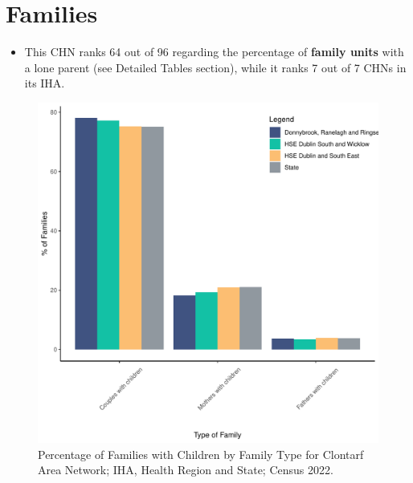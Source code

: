 \documentclass{article}
\begin{document}
\section{Families}\label{sect:Fam}
\begin{itemize}
\item This CHN ranks  64 out of 96 regarding the percentage of \textbf{family units} with a lone parent (see Detailed Tables section), while it ranks   7 out of 7 CHNs in its IHA.
\end{itemize}
\begin{figure}[H]
	\centering
	\includegraphics[width = 150mm]{../figures/FamED.pdf}
	\caption{Percentage of Families with Children by Family Type for Clontarf Area Network; IHA, Health Region and State; Census 2022.}
	\label{fig:vbnv}
	\end{figure}
	
\end{document}
